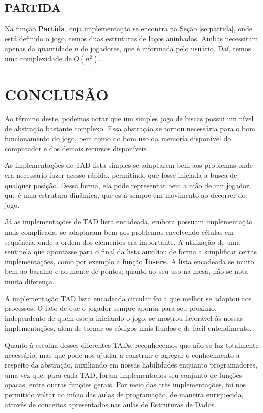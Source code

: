 \documentclass[12pt, oneside, a4paper, brazil]{abntex2}
\begin{document}
\section{PARTIDA}

Na função \textbf{Partida}, cuja implementação se encontra na Seção \ref{se:partida}, onde está definido o jogo, temos duas estruturas de laços aninhados. Ambas necessitam apenas da quantidade $n$ de jogadores, que é informada pelo usuário. Daí, temos uma complexidade de $O(n^2)$.

\chapter*{CONCLUSÃO}

Ao término deste, podemos notar que um simples jogo de biscas possui um nível de abstração bastante complexo. Essa abstração se tornou necessária para o bom funcionamento do jogo, bem como do bom uso da memória disponível do computador e dos demais recursos disponíveis.

As implementações de TAD lista simples se adaptarem bem aos problemas onde era necessário fazer acesso rápido, permitindo que fosse iniciada a busca de qualquer posição. Dessa forma, ela pode representar bem a mão de um jogador, que é uma estrutura dinâmica, que está sempre em movimento ao decorrer do jogo.

Já as implementações de TAD lista encadeada, embora possuam implementação mais complicada, se adaptaram bem aos problemas envolvendo células em sequência, onde a ordem dos elementos era importante. A utilização de uma sentinela que apontasse para o final da lista auxiliou de forma a simplificar certas implementações, como por exemplo a função \textbf{Insere}. A lista encadeada se muito bem ao baralho e ao monte de pontos; quanto ao seu uso na mesa, não se nota muita diferença.

A implementação TAD lista encadeada circular foi a que melhor se adaptou aos processos. O fato de que o jogador sempre aponta para seu próximo, independente de quem esteja iniciando o jogo, se mostrou favorável às nossas implementações, além de tornar os códigos mais fluídos e de fácil entendimento.

Quanto à escolha desses diferentes TADs, reconhecemos que não se faz totalmente necessário, mas que pode nos ajudar a construir e agregar o conhecimento a respeito da abstração, auxiliando em nossas habilidades enquanto programadores, uma vez que, para cada TAD, foram implementados seu conjunto de funções opacas, entre outras funções gerais. Por meio das três implementações, foi nos permitido voltar ao início das aulas de programação, de maneira enriquecida, através de conceitos apresentados nas aulas de Estruturas de Dados.


\end{document}

